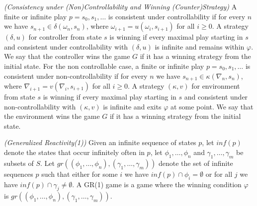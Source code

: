 \begin{definition}\label{def:consistency}\emph{(Consistency under (Non)Controllability and Winning (Counter)Strategy)}
A finite or infinite play $p= s_0,s_1,\ldots$ is consistent under controllability if for every $n$ we have $s_{n+1} \in \delta(\omega_n,s_n)$, where $\omega_{i+1}=u(\omega_i,s_{i+1})$ for all
$i \geq 0$. A strategy $(\delta, u)$ for controller from state $s$ is 
winning if every maximal play starting in $s$ and consistent under controllability with $(\delta, u)$ is infinite and remains within $\varphi$.  We say that the controller wins the game $G$ if it has a winning strategy from the initial state. For the non controllable case,
a finite or infinite play $p= s_0,s_1,\ldots$ is consistent under non-controllability if for every $n$ we have $s_{n+1} \in \kappa(\nabla_n,s_n)$, where $\nabla_{i+1}=v(\nabla_i,s_{i+1})$ for all
$i \geq 0$. A strategy $(\kappa, v)$ for environment from state $s$ is 
winning if every maximal play starting in $s$ and consistent under non-controllability with $(\kappa, v)$ is infinite and exits $\varphi$ at some point.  We say that the environment wins the game $G$ if it has a winning strategy from the initial state.
\end{definition}

\begin{definition}\label{def:generalized-reactivity}\emph{(Generalized Reactivity(1))}
Given an infinite sequence of states $p$, let $inf(p)$ denote the states that occur infinitely often in $p$, let $\phi_1,\ldots,\phi_n$ and $\gamma_1,\ldots,\gamma_m$ be subsets of $S$.  Let $gr((\phi_1,\ldots,\phi_n),(\gamma_1,\ldots,\gamma_m))$ denote the set of infinite sequences $p$ such that either for some $i$ we have $inf(p) \cap \phi_i = \emptyset$ or for all $j$ we have $inf(p)\cap \gamma_j \neq \emptyset$. A GR(1) game is a game where the winning condition $\varphi$ is $gr((\phi_1,\ldots,\phi_n),(\gamma_1,\ldots,\gamma_m))$.
\end{definition}


